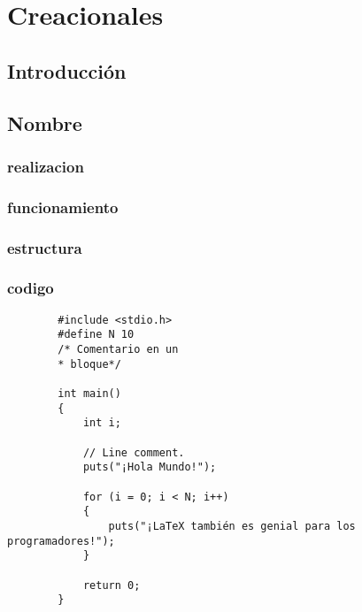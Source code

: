 \chapter{Creacionales}
\section{Introducción}
\newpage
\section{Nombre}
\subsection{realizacion}
\newpage
\subsection{funcionamiento}
\newpage
\subsection{estructura}
\newpage
\subsection{codigo}

	\begin{verbatim}
		#include <stdio.h>
		#define N 10
		/* Comentario en un
		* bloque*/
		
		int main()
		{
			int i;
			
			// Line comment.
			puts("¡Hola Mundo!");
			
			for (i = 0; i < N; i++)
			{
				puts("¡LaTeX también es genial para los programadores!");
			}
			
			return 0;
		}
	\end{verbatim}
\newpage